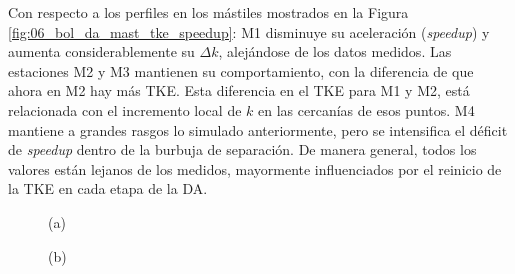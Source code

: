 \vspace*{\fill}
\newpage
Con respecto a los perfiles en los mástiles mostrados en la Figura \ref{fig:06_bol_da_mast_tke_speedup}: M1 disminuye su aceleración (\emph{speedup}) y aumenta considerablemente su $\Delta k$, alejándose de los datos medidos. Las estaciones M2 y M3 mantienen su comportamiento, con la diferencia de que ahora en M2 hay más TKE. Esta diferencia en el TKE para M1 y M2, está relacionada con el incremento local de $k$ en las cercanías de esos puntos. M4 mantiene a grandes rasgos lo simulado anteriormente, pero se intensifica el déficit de \emph{speedup} dentro de la burbuja de separación. De manera general, todos los valores están lejanos de los medidos, mayormente influenciados por el reinicio de la TKE en cada etapa de la DA.
\vspace*{\fill}
\begin{figure}[H]
	\begin{minipage}{0.5\linewidth}
		\centering
		\hspace{7mm}(a)\end{minipage}%
	\begin{minipage}{0.5\linewidth}
		\centering
		\hspace{-5mm}(b)\end{minipage}%
	

\end{figure}
